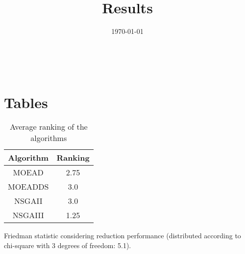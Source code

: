 \documentclass{article}
\title{Results}
\author{}
\date{\today}
\begin{document}
\oddsidemargin 0in \topmargin 0in\maketitle
\
\section{Tables}
\begin{table}[!htp]
\centering
\caption{Average ranking of the algorithms}
\begin{tabular}{c|c}
Algorithm&Ranking\\
\hline
MOEAD&2.75\\
MOEADDS&3.0\\
NSGAII&3.0\\
NSGAIII&1.25\\
\end{tabular}
\end{table}


Friedman statistic considering reduction performance (distributed according to chi-square with 3 degrees of freedom: 5.1).
\end{document}
